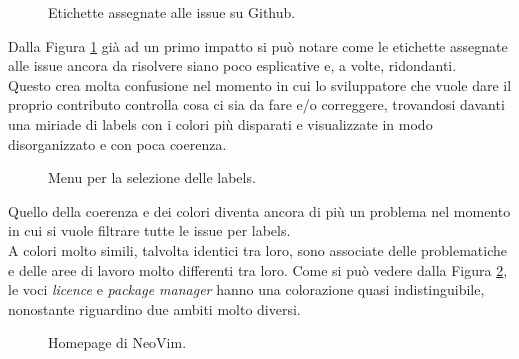 \documentclass[12pt]{article} %
\begin{document}
\begin{figure}[H] 
\caption{Etichette assegnate alle issue su Github.}
\label{fig:cattivoesempio1}
\end{figure}

Dalla Figura \ref{fig:cattivoesempio1} già ad un primo impatto si può notare come le etichette assegnate alle issue ancora da risolvere siano poco esplicative e, a volte, ridondanti.\\
Questo crea molta confusione nel momento in cui lo sviluppatore che vuole dare il proprio contributo controlla cosa ci sia da fare e/o correggere, trovandosi davanti una miriade di labels con i colori più disparati e visualizzate in modo disorganizzato e con poca coerenza.

\begin{figure}[H] 
\caption{Menu per la selezione delle labels.}
\label{fig:cattivoesempio2}
\end{figure}

Quello della coerenza e dei colori diventa ancora di più un problema nel momento in cui si vuole filtrare tutte le issue per labels.\\
A colori molto simili, talvolta identici tra loro, sono associate delle problematiche e delle aree di lavoro molto differenti tra loro. Come si pu\`o vedere dalla Figura \ref{fig:cattivoesempio2}, le voci \emph{licence} e \emph{package manager} hanno una colorazione quasi indistinguibile, nonostante riguardino due ambiti molto diversi.

\begin{figure}[H] 
\caption{Homepage di NeoVim.}
\label{fig:cattivoesempio3}
\end{figure}
\end{document}
